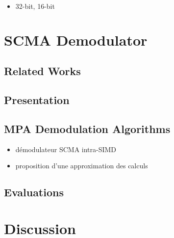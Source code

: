 \begin{itemize}
  \item 32-bit, 16-bit
\end{itemize}

\section{SCMA Demodulator~\cite{Ghaffari2019}}

\subsection{Related Works}

\subsection{Presentation}

\subsection{MPA Demodulation Algorithms}

\begin{itemize}
  \item démodulateur SCMA intra-SIMD
  \item proposition d'une approximation des calculs
\end{itemize}

\subsection{Evaluations}

\section{Discussion}
